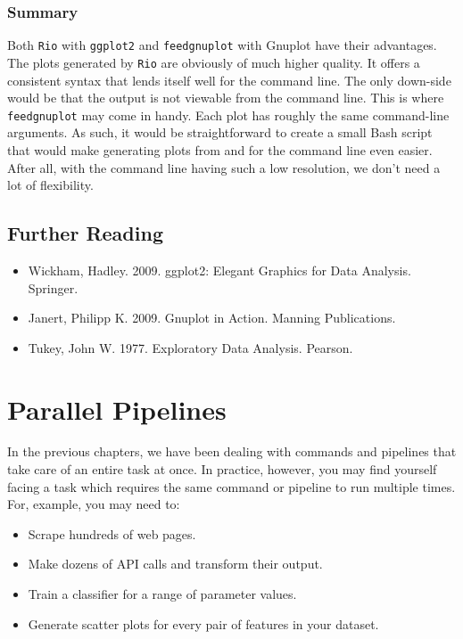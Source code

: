 \documentclass[
]{book}
\providecommand{\tightlist}{%
  \setlength{\itemsep}{0pt}\setlength{\parskip}{0pt}}
\theoremstyle{definition}
\theoremstyle{definition}
\theoremstyle{definition}
\theoremstyle{remark}
\begin{document}
\hypertarget{summary}{%
\subsection{Summary}\label{summary}}

Both \texttt{Rio} with \texttt{ggplot2} and \texttt{feedgnuplot} with Gnuplot have their advantages. The plots generated by \texttt{Rio} are obviously of much higher quality. It offers a consistent syntax that lends itself well for the command line. The only down-side would be that the output is not viewable from the command line. This is where \texttt{feedgnuplot} may come in handy. Each plot has roughly the same command-line arguments. As such, it would be straightforward to create a small Bash script that would make generating plots from and for the command line even easier. After all, with the command line having such a low resolution, we don't need a lot of flexibility.

\hypertarget{further-reading}{%
\section{Further Reading}\label{further-reading}}

\begin{itemize}
\tightlist
\item
  Wickham, Hadley. 2009. ggplot2: Elegant Graphics for Data Analysis. Springer.
\item
  Janert, Philipp K. 2009. Gnuplot in Action. Manning Publications.
\item
  Tukey, John W. 1977. Exploratory Data Analysis. Pearson.
\end{itemize}

\hypertarget{chapter-8-parallel-pipelines}{%
\chapter{Parallel Pipelines}\label{chapter-8-parallel-pipelines}}

In the previous chapters, we have been dealing with commands and pipelines that take care of an entire task at once. In practice, however, you may find yourself facing a task which requires the same command or pipeline to run multiple times. For, example, you may need to:

\begin{itemize}
\tightlist
\item
  Scrape hundreds of web pages.
\item
  Make dozens of API calls and transform their output.
\item
  Train a classifier for a range of parameter values.
\item
  Generate scatter plots for every pair of features in your dataset.
\end{itemize}
\end{document}

